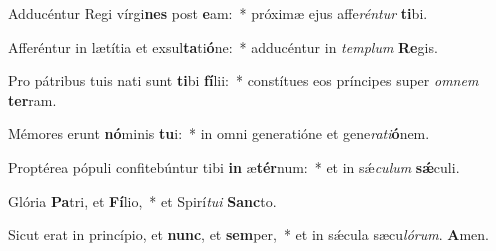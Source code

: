 \item Adducéntur Regi vírgi\textbf{nes} post \textbf{e}am:~* próximæ ejus affe\textit{rén}\textit{tur} \textbf{ti}bi.
\item Afferéntur in lætítia et exsul\textbf{ta}ti\textbf{ó}ne:~* adducéntur in \textit{tem}\textit{plum} \textbf{Re}gis.
\item Pro pátribus tuis nati sunt \textbf{ti}bi \textbf{fí}lii:~* constítues eos príncipes super \textit{om}\textit{nem} \textbf{ter}ram.
\item Mémores erunt \textbf{nó}minis \textbf{tu}i:~* in omni generatióne et gene\textit{ra}\textit{ti}\textbf{ó}nem.
\item Proptérea pópuli confitebúntur tibi \textbf{in} æ\textbf{tér}num:~* et in sǽ\textit{cu}\textit{lum} \textbf{sǽ}culi.
\item Glória \textbf{Pa}tri, et \textbf{Fí}lio,~* et Spirí\textit{tu}\textit{i} \textbf{Sanc}to.
\item Sicut erat in princípio, et \textbf{nunc}, et \textbf{sem}per,~* et in sǽcula sæcu\textit{ló}\textit{rum}. \textbf{A}men.
